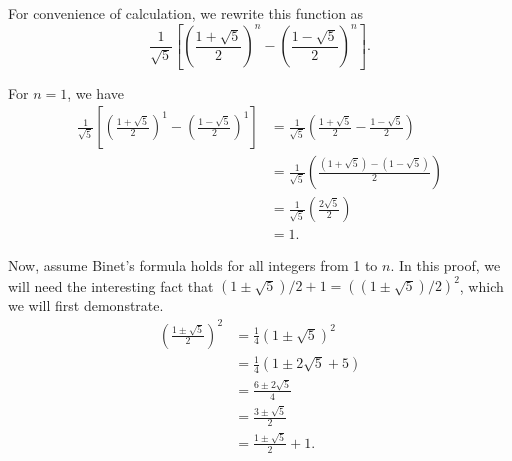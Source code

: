 \begin{exlist}
    For convenience of calculation, we rewrite this function as
    \[\frac{1}{\sqrt{5}} \left[\left(\frac{1+\sqrt{5}}{2}\right)^n - \left(\frac{1-\sqrt{5}}{2}\right)^n\right].\]

    For $n=1$, we have
    \begin{align*}
        \frac{1}{\sqrt{5}} \left[\left(\frac{1+\sqrt{5}}{2}\right)^1 - \left(\frac{1-\sqrt{5}}{2}\right)^1\right] &= \frac{1}{\sqrt{5}} \left(\frac{1+\sqrt{5}}{2} - \frac{1-\sqrt{5}}{2}\right) \\
        &= \frac{1}{\sqrt{5}} \left(\frac{(1+\sqrt{5}) - (1-\sqrt{5})}{2}\right) \\
        &= \frac{1}{\sqrt{5}} \left(\frac{2\sqrt{5}}{2}\right) \\
        &= 1.
    \end{align*}

    Now, assume Binet's formula holds for all integers from 1 to $n$. In this proof, we will need the interesting fact that $(1 \pm \sqrt{5})/2 + 1 = \left(\left(1 \pm \sqrt{5}\right)/2\right)^2$, which we will first demonstrate.
    \begin{align*}
        \left(\frac{1 \pm \sqrt{5}}{2}\right)^2 &= \frac{1}{4} \left(1 \pm \sqrt{5}\right)^2 \\
        &= \frac{1}{4} (1 \pm 2\sqrt{5} + 5) \\
        &= \frac{6 \pm 2\sqrt{5}}{4} \\
        &= \frac{3 \pm \sqrt{5}}{2} \\
        &= \frac{1 \pm \sqrt{5}}{2} + 1.
    \end{align*}
    \pagebreak


\end{exlist}

